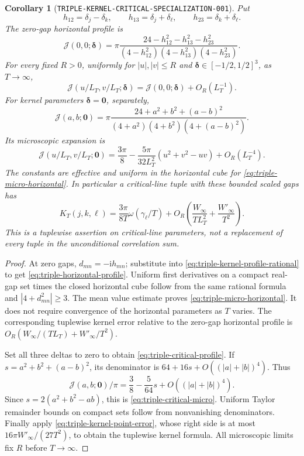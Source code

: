 \documentclass[11pt]{article}
\newtheorem{corollary}[lemma]{Corollary}
\newcommand{\ii}{\mathrm i}
\begin{document}
\begin{corollary}[\texttt{TRIPLE-KERNEL-CRITICAL-SPECIALIZATION-001}]
\label{cor:triple-kernel-critical}
Put
\[
 h_{12}=\delta_j-\delta_k,\qquad
 h_{13}=\delta_j+\delta_\ell,\qquad
 h_{23}=\delta_k+\delta_\ell.
\]
The zero-gap horizontal profile is
\begin{equation}\label{eq:triple-horizontal-profile}
 \mathcal J(0,0;\boldsymbol\delta)
 =\pi\frac{24-h_{12}^2-h_{13}^2-h_{23}^2}
 {(4-h_{12}^2)(4-h_{13}^2)(4-h_{23}^2)}.
\end{equation}
For every fixed \(R>0\), uniformly for \(|u|,|v|\leq R\) and
\(\boldsymbol\delta\in[-1/2,1/2]^3\), as \(T\to\infty\),
\begin{equation}\label{eq:triple-micro-horizontal}
 \mathcal J(u/L_T,v/L_T;\boldsymbol\delta)
 =\mathcal J(0,0;\boldsymbol\delta)+O_R(L_T^{-1}).
\end{equation}
For kernel parameters \(\boldsymbol\delta=\mathbf0\), separately,
\begin{equation}\label{eq:triple-critical-profile}
 \mathcal J(a,b;\mathbf0)
 =\pi\frac{24+a^2+b^2+(a-b)^2}
 {(4+a^2)(4+b^2)(4+(a-b)^2)}.
\end{equation}
Its microscopic expansion is
\begin{equation}\label{eq:triple-critical-micro}
 \mathcal J(u/L_T,v/L_T;\mathbf0)
 =\frac{3\pi}{8}-\frac{5\pi}{32L_T^2}(u^2+v^2-uv)
                         +O_R(L_T^{-4}).
\end{equation}
The constants are effective and uniform in the horizontal cube for
\eqref{eq:triple-micro-horizontal}. In particular a critical-line tuple
with these bounded scaled gaps has
\[
 K_T(j,k,\ell)=\frac{3\pi}{8T}\omega(\gamma_\ell/T)
       +O_R\left(\frac{W_\infty}{TL_T^2}
                         +\frac{W'_{\infty}}{T^2}\right).
\]
This is a tuplewise assertion on critical-line parameters, not a
replacement of every tuple in the unconditional correlation sum.
\end{corollary}
\begin{proof}
At zero gaps, \(d_{mn}=-\ii h_{mn}\); substitute into
\eqref{eq:triple-kernel-profile-rational} to get
\eqref{eq:triple-horizontal-profile}. Uniform first derivatives on a
compact real-gap set times the closed horizontal cube follow from the
same rational formula and \(|4+d_{mn}^2|\geq3\).
The mean value estimate proves \eqref{eq:triple-micro-horizontal}.
It does not require convergence of the horizontal parameters as \(T\)
varies. The corresponding tuplewise kernel error relative to the
zero-gap horizontal profile is
\(O_R(W_\infty/(TL_T)+W'_{\infty}/T^2)\).

Set all three deltas to zero to obtain
\eqref{eq:triple-critical-profile}. If
\(s=a^2+b^2+(a-b)^2\), its denominator is
\(64+16s+O((|a|+|b|)^4)\). Thus
\[
 \mathcal J(a,b;\mathbf0)/\pi
 =\frac38-\frac5{64}s+O((|a|+|b|)^4).
\]
Since \(s=2(a^2+b^2-ab)\), this is
\eqref{eq:triple-critical-micro}. Uniform Taylor remainder bounds on
compact sets follow from nonvanishing denominators. Finally apply
\eqref{eq:triple-kernel-point-error}, whose right side is at most
\(16\pi W'_{\infty}/(27T^2)\), to obtain the tuplewise kernel formula.
All microscopic limits fix \(R\) before \(T\to\infty\).
\end{proof}
\end{document}

